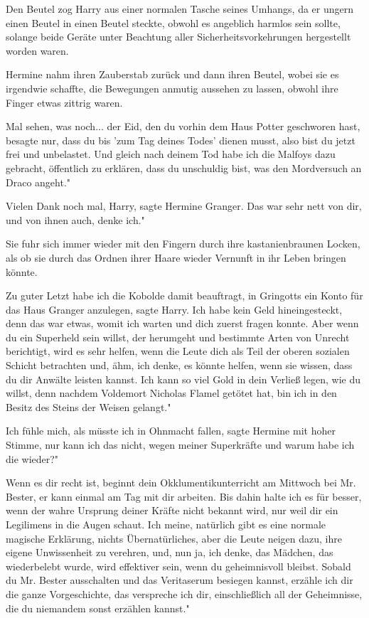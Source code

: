 Den Beutel zog Harry aus einer normalen Tasche seines Umhangs, da er ungern
einen Beutel in einen Beutel steckte, obwohl es angeblich harmlos sein sollte,
solange beide Geräte unter Beachtung aller Sicherheitsvorkehrungen hergestellt
worden waren.

Hermine nahm ihren Zauberstab zurück und dann ihren Beutel, wobei sie es
irgendwie schaffte, die Bewegungen anmutig aussehen zu lassen, obwohl ihre
Finger etwas zittrig waren.

\glqq{}Mal sehen, was noch... der Eid, den du vorhin dem Haus Potter geschworen
hast, besagte nur, dass du bis 'zum Tag deines Todes' dienen musst, also bist du
jetzt frei und unbelastet. Und gleich nach deinem Tod habe ich die Malfoys dazu
gebracht, öffentlich zu erklären, dass du unschuldig bist, was den Mordversuch
an Draco angeht."

\glqq{}Vielen Dank noch mal, Harry\grqq{}, sagte Hermine Granger. \glqq{}Das war
sehr nett von dir, und von ihnen auch, denke ich."

Sie fuhr sich immer wieder mit den Fingern durch ihre kastanienbraunen Locken,
als ob sie durch das Ordnen ihrer Haare wieder Vernunft in ihr Leben bringen
könnte.

\glqq{}Zu guter Letzt habe ich die Kobolde damit beauftragt, in Gringotts ein
Konto für das Haus Granger anzulegen\grqq{}, sagte Harry. \glqq{}Ich habe kein
Geld hineingesteckt, denn das war etwas, womit ich warten und dich zuerst fragen
konnte. Aber wenn du ein Superheld sein willst, der herumgeht und bestimmte
Arten von Unrecht berichtigt, wird es sehr helfen, wenn die Leute dich als Teil
der oberen sozialen Schicht betrachten und, ähm, ich denke, es könnte helfen,
wenn sie wissen, dass du dir Anwälte leisten kannst. Ich kann so viel Gold in
dein Verließ legen, wie du willst, denn nachdem Voldemort Nicholas Flamel
getötet hat, bin ich in den Besitz des Steins der Weisen gelangt."

\glqq{}Ich fühle mich, als müsste ich in Ohnmacht fallen\grqq{}, sagte Hermine
mit hoher Stimme, \glqq{}nur kann ich das nicht, wegen meiner Superkräfte und
warum habe ich die wieder?"

\glqq{}Wenn es dir recht ist, beginnt dein Okklumentikunterricht am Mittwoch bei
Mr. Bester, er kann einmal am Tag mit dir arbeiten. Bis dahin halte ich es für
besser, wenn der wahre Ursprung deiner Kräfte nicht bekannt wird, nur weil dir
ein Legilimens in die Augen schaut. Ich meine, natürlich gibt es eine normale
magische Erklärung, nichts Übernatürliches, aber die Leute neigen dazu, ihre
eigene Unwissenheit zu verehren, und, nun ja, ich denke, das Mädchen, das
wiederbelebt wurde, wird effektiver sein, wenn du geheimnisvoll bleibst. Sobald
du Mr. Bester ausschalten und das Veritaserum besiegen kannst, erzähle ich dir
die ganze Vorgeschichte, das verspreche ich dir, einschließlich all der
Geheimnisse, die du niemandem sonst erzählen kannst."

